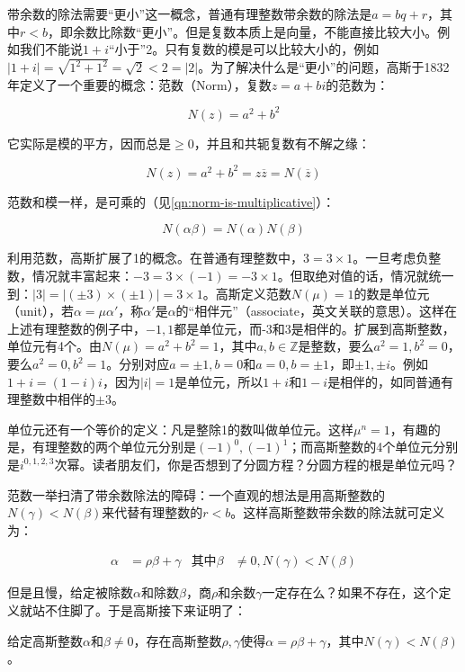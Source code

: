 \documentclass[b5paper]{ctexart}
\begin{document}
带余数的除法需要“更小”这一概念，普通有理整数带余数的除法是$a = bq + r$，其中$r < b$，即余数比除数“更小”。但是复数本质上是向量，不能直接比较大小。例如我们不能说$1 + i$“小于”2。只有复数的模是可以比较大小的，例如$|1 + i| = \sqrt{1^2 + 1^2} = \sqrt{2} < 2 = |2|$。为了解决什么是“更小”的问题，高斯于1832年定义了一个重要的概念：范数（Norm），复数$z = a + bi$的范数为：

\[
N(z) = a^2 + b^2
\]

它实际是模的平方，因而总是$\geq 0$，并且和共轭复数有不解之缘：

\[
N(z) = a^2 + b^2 = z\overline{z} = N(\overline{z})
\]

范数和模一样，是可乘的（见\cref{qn:norm-is-multiplicative}）：

\[
N(\alpha\beta) = N(\alpha)N(\beta)
\]

利用范数，高斯扩展了1的概念。在普通有理整数中，$3 = 3 \times 1$。一旦考虑负整数，情况就丰富起来：$-3 = 3 \times (-1) = -3 \times 1$。但取绝对值的话，情况就统一到：$|3| = |(\pm 3) \times (\pm 1)| = 3 \times 1$。高斯定义范数$N(\mu) = 1$的数是单位元（unit），若$\alpha = \mu \alpha'$，称$\alpha'$是$\alpha$的“相伴元”（associate，英文关联的意思）。这样在上述有理整数的例子中，$-1, 1$都是单位元，而-3和3是相伴的。扩展到高斯整数，单位元有4个。由$N(\mu) = a^2 + b^2 = 1$，其中$a, b \in \mathbb{Z}$是整数，要么$a^2 = 1, b^2 = 0$，要么$a^2 = 0, b^2 = 1$。分别对应$a = \pm 1, b = 0$和$a = 0, b = \pm 1$，即$\pm 1, \pm i$。例如$1 + i = (1 - i)i$，因为$|i| = 1$是单位元，所以$1 + i$和$1 - i$是相伴的，如同普通有理整数中相伴的$\pm 3$。

单位元还有一个等价的定义：凡是整除1的数叫做单位元。这样$\mu^n = 1$，有趣的是，有理整数的两个单位元分别是$(-1)^0, (-1)^1$；而高斯整数的4个单位元分别是$i^{0, 1, 2, 3}$次幂。读者朋友们，你是否想到了分圆方程？分圆方程的根是单位元吗？

范数一举扫清了带余数除法的障碍：一个直观的想法是用高斯整数的$N(\gamma) < N(\beta)$来代替有理整数的$r < b$。这样高斯整数带余数的除法就可定义为：

\begin{align*}
\alpha &= \rho \beta + \gamma & \text{其中} \beta &\ne 0, N(\gamma) < N(\beta)
\end{align*}

但是且慢，给定被除数$\alpha$和除数$\beta$，商$\rho$和余数$\gamma$一定存在么？如果不存在，这个定义就站不住脚了。于是高斯接下来证明了：

\begin{theorem}
给定高斯整数$\alpha$和$\beta \ne 0$，存在高斯整数$\rho, \gamma$使得$\alpha = \rho \beta + \gamma$，其中$N(\gamma) < N(\beta)$。
\end{theorem}
\end{document}
